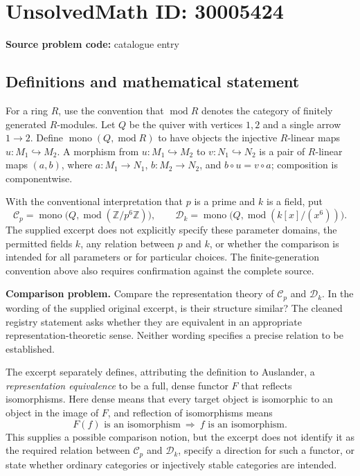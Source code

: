 \documentclass[11pt]{article}
\newcommand{\Z}{\mathbb{Z}}
\begin{document}
\section*{UnsolvedMath ID: 30005424}
\textbf{Source problem code:} catalogue entry
\subsection{Definitions and mathematical statement}
For a ring \(R\), use the convention that \(\operatorname{mod}R\) denotes the category of finitely generated \(R\)-modules. Let \(Q\) be the quiver with vertices \(1,2\) and a single arrow \(1\to2\). Define \(\operatorname{mono}(Q,\operatorname{mod}R)\) to have objects the injective \(R\)-linear maps \(u\colon M_1\hookrightarrow M_2\). A morphism from \(u\colon M_1\hookrightarrow M_2\) to \(v\colon N_1\hookrightarrow N_2\) is a pair of \(R\)-linear maps \((a,b)\), where \(a\colon M_1\to N_1\), \(b\colon M_2\to N_2\), and \(b\circ u=v\circ a\); composition is componentwise.

With the conventional interpretation that \(p\) is a prime and \(k\) is a field, put
\[
\mathcal C_p=\operatorname{mono}\bigl(Q,\operatorname{mod}(\Z/p^6\Z)\bigr),\qquad
\mathcal D_k=\operatorname{mono}\bigl(Q,\operatorname{mod}(k[x]/(x^6))\bigr).
\]
The supplied excerpt does not explicitly specify these parameter domains, the permitted fields \(k\), any relation between \(p\) and \(k\), or whether the comparison is intended for all parameters or for particular choices. The finite-generation convention above also requires confirmation against the complete source.

\textbf{Comparison problem.} Compare the representation theory of \(\mathcal C_p\) and \(\mathcal D_k\). In the wording of the supplied original excerpt, is their structure similar? The cleaned registry statement asks whether they are equivalent in an appropriate representation-theoretic sense. Neither wording specifies a precise relation to be established.

The excerpt separately defines, attributing the definition to Auslander, a \emph{representation equivalence} to be a full, dense functor \(F\) that reflects isomorphisms. Here dense means that every target object is isomorphic to an object in the image of \(F\), and reflection of isomorphisms means
\[
F(f)\text{ is an isomorphism}\ \Longrightarrow\ f\text{ is an isomorphism}.
\]
This supplies a possible comparison notion, but the excerpt does not identify it as the required relation between \(\mathcal C_p\) and \(\mathcal D_k\), specify a direction for such a functor, or state whether ordinary categories or injectively stable categories are intended.
\end{document}
